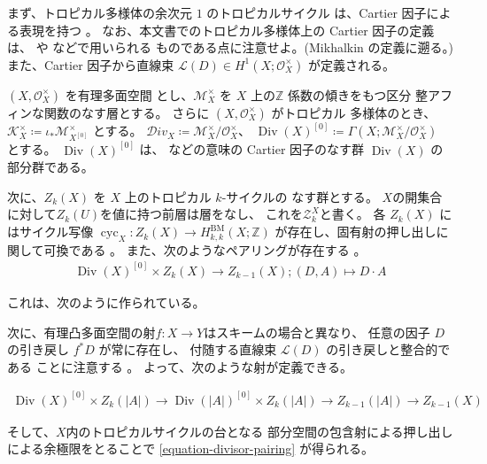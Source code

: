 \documentclass[a4paper,dvipdfmx,reqno,12pt]{amsart}
\theoremstyle{definition}
\newcommand{\deq}{\coloneqq}
\newcommand{\opn}[1]{\operatorname{#1}}
\numberwithin{equation}{section}
\begin{document}
まず、トロピカル多様体の余次元 $1$ のトロピカルサイクル
は、Cartier 因子による表現を持つ
\cite[Proposition 3.27]{shaw2015tropical}。
なお、本文書でのトロピカル多様体上の 
Cartier 因子の定義は、
\cite{shaw2015tropical} や
\cite{demedrano2023chern} などで用いられる
ものである点に注意せよ。(Mikhalkin の定義に遡る。)
また、Cartier 因子から直線束
$\mathcal{L}(D)\in H^{1}(X;\mathcal{O}_X^{\times})$
が定義される。

$(X,\mathcal{O}_X^{\times})$ を有理多面空間
とし、$\mathcal{M}_X^{\times}$ を
$X$ 上の$\mathbb{Z}$ 係数の傾きをもつ区分
整アフィンな関数のなす層とする。
さらに $(X,\mathcal{O}_X^{\times})$ がトロピカル
多様体のとき、
$\mathcal{K}_{X}^{\times}
\deq \iota_*\mathcal{M}_{X^{[0]}}^{\times}$
とする。
$\mathcal{D}iv_X\deq \mathcal{M}_X^{\times}/
\mathcal{O}_X^{\times}$、
$\opn{Div}(X)^{[0]}\deq \Gamma(X;\mathcal{M}_X^{\times}/
\mathcal{O}_X^{\times})$
とする\cite[Deifinition 3.10]{MR4637248}。
$\opn{Div}(X)^{[0]}$ は、
\cite{demedrano2023chern} などの意味の Cartier 
因子のなす群 $\opn{Div}(X)$ の部分群である。

次に、$Z_k(X)$ を $X$ 上のトロピカル $k$-サイクルの
なす群とする\cite[Definition 3.5]{MR4637248}。
$X$の開集合に対して$Z_k(U)$を値に持つ前層は層をなし、
これを$\mathscr{Z}_k^{X}$と書く。
各 $Z_k(X)$ にはサイクル写像
$\opn{cyc}_X \colon Z_k(X)\to 
H^{\mathrm{BM}}_{k,k}(X;\mathbb{Z})$
が存在し、固有射の押し出しに関して可換である
\cite[Definition 5.4 and Corollary 5.8]{MR4637248}。
また、次のようなペアリングが存在する
\cite[]{MR4637248}。
\begin{align}
\label{equation-divisor-pairing}
\opn{Div}(X)^{[0]}\times Z_{k}(X)\to Z_{k-1}(X);
(D,A) \mapsto D\cdot A
\end{align}

これは、次のように作られている。

次に、有理凸多面空間の射$f\colon X\to Y$はスキームの場合と異なり、
任意の因子 $D$ の引き戻し $f^{*}D$ が常に存在し、
付随する直線束 $\mathcal{L}(D)$ の引き戻しと整合的である
ことに注意する
\cite[Propoisition 3.15]{gross2019sheaftheoretic}。
よって、次のような射が定義できる。

\begin{align}
\opn{Div}(X)^{[0]}\times Z_{k}(|A|) \to 
\opn{Div}(|A|)^{[0]} \times Z_{k}(|A|) \to
Z_{k-1}(|A|) \to
Z_{k-1}(X)
\end{align}

そして、$X$内のトロピカルサイクルの台となる
部分空間の包含射による押し出し
による余極限をとることで
\cref{equation-divisor-pairing} が得られる。
\end{document}
